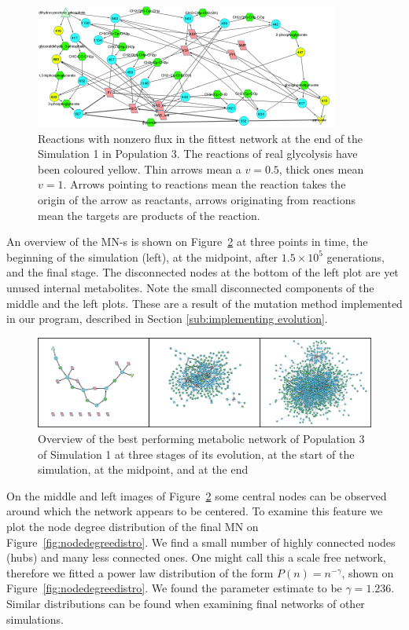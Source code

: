\documentclass[a4paper,12pt]{article}
\begin{document}
\begin{figure}[htpb]
	\centering
	\includegraphics[width=1\linewidth]{trunk_glyc_final_job1_colored.pdf}
	\caption{Reactions with nonzero flux in the fittest network at the end of the Simulation 1 in Population 3. The reactions of real glycolysis have been coloured yellow. Thin arrows mean a $v=0.5$, thick ones mean $v=1$. Arrows pointing to reactions mean the reaction takes the origin of the arrow as reactants, arrows originating from reactions mean the targets are products of the reaction.}
	\label{fig:trunk_glyc_final_job1}
\end{figure}


An overview of the MN-s is shown on Figure~\ref{fig:init-mid-final} at three points in time, the beginning of the simulation (left), at the midpoint, after $1.5\times 10^5$ generations, and the final stage. The disconnected nodes at the bottom of the left plot are yet unused internal metabolites. Note the small disconnected components of the middle and the left plots. These are a result of the mutation method implemented in our program, described in Section \ref{sub:implementing evolution}. 

\begin{figure}[htpb]
	\centering
	\includegraphics[width=1\linewidth]{init-mid-final.png}
	\caption{Overview of the best performing metabolic network of Population 3 of Simulation 1 at three stages of its evolution, at the start of the simulation, at the midpoint, and at the end}
	\label{fig:init-mid-final}
\end{figure}

On the middle and left images of Figure~\ref{fig:init-mid-final} some central nodes can be observed around which the network appears to be centered. To examine this feature we plot the node degree distribution of the final MN on Figure~\ref{fig:nodedegreedistro}. We find a small number of highly connected nodes (hubs) and many less connected ones. One might call this a scale free network, therefore we fitted a power law distribution of the form $P(n)=n^{-\gamma}$, shown on Figure~\ref{fig:nodedegreedistro}. We found the parameter estimate to be $\gamma=1.236$. Similar distributions can be found when examining final networks of other simulations. 
\end{document}
